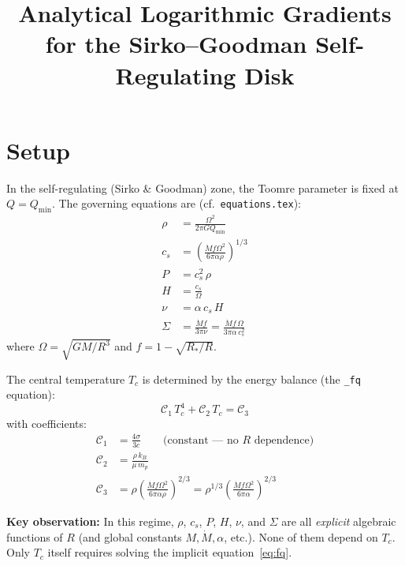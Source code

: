 \documentclass[11pt]{article}
\title{Analytical Logarithmic Gradients for the Sirko--Goodman Self-Regulating Disk}
\date{}
\begin{document}
\maketitle

\section{Setup}

In the self-regulating (Sirko \& Goodman) zone, the Toomre parameter is fixed at $Q = Q_{\min}$. The governing equations are (cf.\ \texttt{equations.tex}):
\begin{align}
    \rho &= \frac{\Omega^2}{2\pi G Q_{\min}} \label{eq:rho} \\[6pt]
    c_s &= \left(\frac{\dot{M} f \Omega^2}{6\pi\alpha\rho}\right)^{1/3} \label{eq:cs} \\[6pt]
    P &= c_s^2\,\rho \label{eq:P} \\[6pt]
    H &= \frac{c_s}{\Omega} \label{eq:H} \\[6pt]
    \nu &= \alpha\, c_s\, H \label{eq:visc} \\[6pt]
    \Sigma &= \frac{\dot{M} f}{3\pi\nu} = \frac{\dot{M} f\, \Omega}{3\pi\alpha\, c_s^2} \label{eq:Sigma}
\end{align}
where $\Omega = \sqrt{GM/R^3}$ and $f = 1 - \sqrt{R_*/R}$.

The central temperature $T_c$ is determined by the energy balance (the \texttt{\_fq} equation):
\begin{equation}
    \mathcal{C}_1\, T_c^4 + \mathcal{C}_2\, T_c = \mathcal{C}_3 \label{eq:fq}
\end{equation}
with coefficients:
\begin{align}
    \mathcal{C}_1 &= \frac{4\sigma}{3c} \qquad\text{(constant --- no $R$ dependence)} \label{eq:C1} \\[4pt]
    \mathcal{C}_2 &= \frac{\rho\, k_B}{\mu\, m_p} \label{eq:C2} \\[4pt]
    \mathcal{C}_3 &= \rho\left(\frac{\dot{M} f \Omega^2}{6\pi\alpha\rho}\right)^{2/3}
    = \rho^{1/3}\left(\frac{\dot{M} f \Omega^2}{6\pi\alpha}\right)^{2/3} \label{eq:C3}
\end{align}

\medskip\noindent
\textbf{Key observation:} In this regime, $\rho$, $c_s$, $P$, $H$, $\nu$, and $\Sigma$ are all \emph{explicit} algebraic functions of $R$ (and global constants $M, \dot{M}, \alpha$, etc.). None of them depend on $T_c$. Only $T_c$ itself requires solving the implicit equation~\eqref{eq:fq}.
\end{document}

